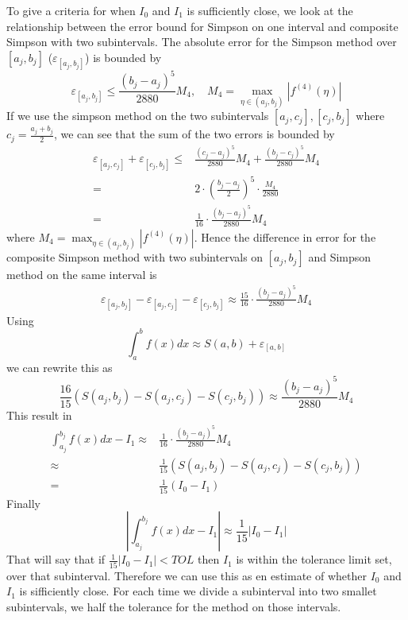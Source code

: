 \documentclass[12pt, a4paper,usenames,dvipsnames]{article}
\begin{document}
To give a criteria for when \(I_0\) and \(I_1\) is sufficiently close, we look at the relationship between the error bound for Simpson on one interval and composite Simpson with two subintervals. The absolute error for the Simpson method over \([a_j,b_j]\) (\(\varepsilon_{[a_j,b_j]}\)) is bounded by 
\[\varepsilon_{[a_j,b_j]}\leq \frac{(b_j-a_j)^5}{2880}M_4,\quad M_4=\max_{\eta\in(a_j,b_j)}|f^{(4)}(\eta)|\]
If we use the simpson method on the two subintervals \([a_j,c_j],[c_j,b_j]\) where \(c_j=\frac{a_j+b_j}{2}\), we can see that the sum of the two errors is bounded by 
\begin{equation*}
    \begin{split}
        \varepsilon_{[a_j,c_j]}+\varepsilon_{[c_j,b_j]}\leq& \frac{(c_j-a_j)^5}{2880}M_4+\frac{(b_j-c_j)^5}{2880}M_4\\
        =&2\cdot\left(\frac{b_j-a_j}{2}\right)^5\cdot\frac{M_4}{2880}\\
        =&\frac{1}{16}\cdot\frac{(b_j-a_j)^5}{2880}M_4
    \end{split}
\end{equation*}
where \(M_4=\max_{\eta \in (a_j,b_j)}|f^{(4)}(\eta)|\). Hence the difference in error for the composite Simpson method with two subintervals on \([a_j,b_j]\) and Simpson method on the same interval is
\begin{equation*}
    \begin{split}
        \varepsilon_{[a_j,b_j]}-\varepsilon_{[a_j,c_j]}-\varepsilon_{[c_j,b_j]}\approx \frac{15}{16}\cdot\frac{(b_j-a_j)^5}{2880}M_4
    \end{split}
\end{equation*}
Using 
\[\int_a^bf(x)dx\approx S(a,b)+\varepsilon_{[a,b]}\]
we can rewrite this as
\[\frac{16}{15}\left(S(a_j,b_j)-S(a_j,c_j)-S(c_j,b_j)\right)\approx\frac{(b_j-a_j)^5}{2880}M_4\]
This result in
\begin{equation*}
    \begin{split}
        \int_{a_j}^{b_j}f(x)dx-I_1\approx&\frac{1}{16}\cdot\frac{(b_j-a_j)^5}{2880}M_4\\
         \approx&\frac{1}{15}\left(S(a_j,b_j)-S(a_j,c_j)-S(c_j,b_j)\right)\\
         =&\frac{1}{15}(I_0-I_1)
    \end{split}
\end{equation*}
Finally
\[\left|\int_{a_j}^{b_j}f(x)dx-I_1\right|\approx\frac{1}{15}\left|I_0-I_1\right|\]
That will say that if \(\frac{1}{15}|I_0-I_1|<TOL\) then \(I_1\) is within the tolerance limit set, over that subinterval. Therefore we can use this as en estimate of whether \(I_0\) and \(I_1\) is sifficiently close. For each time we divide a subinterval into two smallet subintervals, we half the tolerance for the method on those intervals.  
\end{document}
